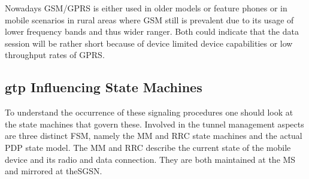 Nowadays \gls{GSM}/\gls{GPRS} is either used in older models or feature phones or in mobile scenarios in rural areas where \gls{GSM} still is prevalent due to its usage of lower frequency bands and thus wider ranger. Both could indicate that the data session will be rather short because of device limited device capabilities or low throughput rates of \gls{GPRS}.


\subsection{\texorpdfstring{\acrshort{gtp}}{GTP} Influencing State Machines}

To understand the occurrence of these signaling procedures one should look at the state machines that govern these. Involved in the tunnel management aspects are three distinct \gls{FSM}, namely the \gls{MM} and \gls{RRC} state machines and the actual \gls{PDP} state model. The \gls{MM} and \gls{RRC} describe the current state of the mobile device and its radio and data connection. They are both maintained at the \gls{MS} and mirrored at the\gls{SGSN}.


